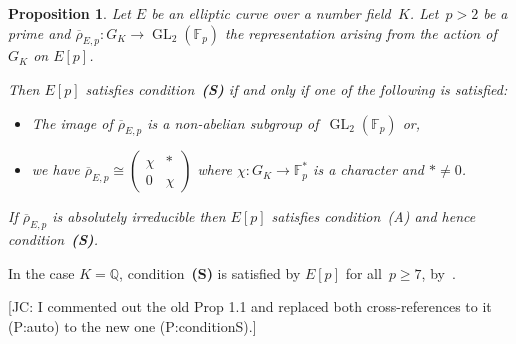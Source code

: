 \documentclass[12pt, reqno]{amsart}
\newcommand{\F}{\mathbb{F}}
\newcommand{\Q}{\mathbb{Q}}
\newcommand{\Z}{\mathbb{Z}}
\newcommand{\rhobar}{{\overline{\rho}}}
\newcommand{\GL}{\operatorname{GL}}
\numberwithin{equation}{section}
\newtheorem{proposition}[theorem]{Proposition}
\theoremstyle{definition}
\theoremstyle{remark}
\newcommand{\jc}[1]{{\color{darkgreen} \textsf{[JC: #1]}}}
\begin{document}
\begin{proposition} \label{P:conditionS}
Let $E$ be an elliptic curve over a number field~$K$. Let~$p > 2$ be a prime and $\rhobar_{E,p} : G_K \to \GL_2(\F_p)$ the representation arising from the action of~$G_K$ on $E[p]$. 

Then $E[p]$ satisfies condition~{\bf (S)} if and only if one of the following is satisfied:
 \begin{itemize}
 \item[(A)] The image of $\rhobar_{E,p}$ is a non-abelian subgroup of~$\GL_2(\F_p)$ or,
 \item[(B)] we have $\rhobar_{E,p} \cong \left( \begin{smallmatrix} \chi & * \\ 0 & \chi \end{smallmatrix} \right)$ where $\chi : G_K \to \F_p^*$ is a character
 and $* \neq 0$.
 \end{itemize}
If $\rhobar_{E,p}$ is absolutely irreducible then $E[p]$ satisfies
condition~(A) and hence condition~{\bf (S)}.  \end{proposition}


In the case $K=\Q$, condition~{\bf (S)} is satisfied by $E[p]$ for
all~$p\ge7$, by~\cite[Corollary~3 and Proposition~2]{FKSym}.

\jc{I commented out the old Prop 1.1 and replaced both cross-references
  to it (P:auto) to the new one (P:conditionS).}

\begin{comment}
\begin{proposition}\label{P:auto}
  Let $E$ and~$E'$ be elliptic curves defined over~$\Q$ such that
  $E[p]\cong E'[p]$ as $G_\Q$-modules.
  \begin{enumerate}
    \item If $E[p]$ is irreducible, then the isomorphism $E[p]\cong
      E'[p]$ is unique up to scaling; hence its symplectic type is
      well-defined.
      \item If $p\ge7$ then the same conclusion also holds when
        $E[p]$ is reducible.
  \end{enumerate}
\end{proposition}
\begin{proof} See~\cite[Corollary~3 and Proposition~2]{FKSym}
\end{proof}
\end{comment}

\begin{comment}
both have $5$-torsion Galois module isomorphic to $\mu_5
\times \Z/5\Z$.  Now let $P,Q \in E[5]$ and $P',Q' \in E'[5]$ be bases
such that $P$, $P'$ are defined over~$\Q$.  The map defined by $P
\mapsto P'$ and $Q \mapsto n\cdot Q'$ (with $5 \nmid n$) is a
$G_\Q$-isomorphism which is symplectic if and only if $n$ is a square
mod~$5$.  Moreover, the automorphism $\alpha$ of $E[5]$ given by
$\alpha(P) = P$ and $\alpha(Q) = 2Q$ is anti-symplectic because $2$ is
not a square modulo~$5$.
\end{comment}
\end{document}
